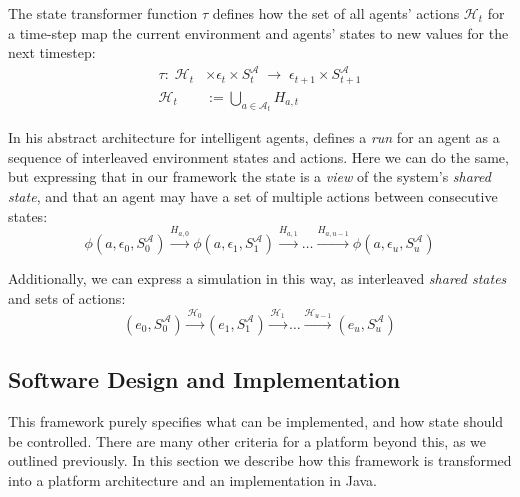 The state transformer function $\tau$ defines how the set of all
agents' actions $\mathcal{H}_{t}$ for a time-step map the current
environment and agents' states to new values for the next timestep:
\begin{align*}
\tau:\;\mathcal{H}_{t}&\times\epsilon_{t}\times S_{t}^{\mathcal{A}}\;\rightarrow\;\epsilon_{t+1}\times S_{t+1}^{\mathcal{A}} \\
\mathcal{H}{}_{t}&:=\bigcup_{a\in\mathcal{A}_{t}}H_{a,t}
\end{align*}

In his abstract architecture for intelligent agents, \citet{Wooldridge2002}
defines a \emph{run} for an agent as a sequence of interleaved environment
states and actions. Here we can do the same, but expressing that in our
framework the state is a \emph{view} of the system's \emph{shared state}, and
that an agent may have a set of multiple actions between consecutive states:
\begin{equation*}
\phi(a, \epsilon_{0}, S_{0}^{\mathcal{A}}) \xrightarrow{H_{a,0}} \phi(a, \epsilon_{1}, S_{1}^{\mathcal{A}}) \xrightarrow{H_{a,1}}  \ldots \xrightarrow{H_{a,u-1}} \phi(a, \epsilon_{u}, S_{u}^{\mathcal{A}})
\end{equation*}

Additionally, we can express a simulation in this way, as interleaved \emph{
shared states} and sets of actions:
\begin{equation*}
(e_0, S_{0}^{\mathcal{A}}) \xrightarrow{\mathcal{H}_{0}} (e_1, S_{1}^{\mathcal{A}}) \xrightarrow{\mathcal{H}_{1}} \ldots \xrightarrow{\mathcal{H}_{u-1}} (e_u, S_{u}^{\mathcal{A}})
\end{equation*}


\subsection{Software Design and Implementation}

This framework purely specifies what can be implemented, and how state should
be controlled. There are many other criteria for a platform beyond this, as we
outlined previously. In this section we describe how this framework is
transformed into a platform architecture and an implementation in Java.

